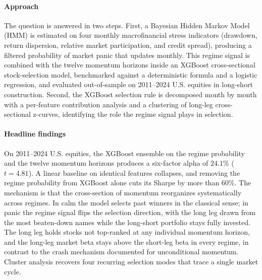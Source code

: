 \paragraph{Approach} The question is answered in two steps. First, a Bayesian Hidden Markov Model (HMM) is estimated on four monthly macrofinancial stress indicators (drawdown, return dispersion, relative market participation, and credit spread), producing a filtered probability of market panic that updates monthly. This regime signal is combined with the twelve momentum horizons inside an XGBoost cross-sectional stock-selection model, benchmarked against a deterministic formula and a logistic regression, and evaluated out-of-sample on 2011--2024 U.S. equities in long-short construction. Second, the XGBoost selection rule is decomposed month by month with a per-feature contribution analysis and a clustering of long-leg cross-sectional z-curves, identifying the role the regime signal plays in selection.

\paragraph{Headline findings} On 2011--2024 U.S. equities, the XGBoost ensemble on the regime probability and the twelve momentum horizons produces a six-factor alpha of $24.1\%$ ($t = 4.81$). A linear baseline on identical features collapses, and removing the regime probability from XGBoost alone cuts its Sharpe by more than $60\%$. The mechanism is that the cross-section of momentum reorganizes systematically across regimes. In calm the model selects past winners in the classical sense; in panic the regime signal flips the selection direction, with the long leg drawn from the most beaten-down names while the long-short portfolio stays fully invested. The long leg holds stocks not top-ranked at any individual momentum horizon, and the long-leg market beta stays above the short-leg beta in every regime, in contrast to the crash mechanism documented for unconditional momentum. Cluster analysis recovers four recurring selection modes that trace a single market cycle.

